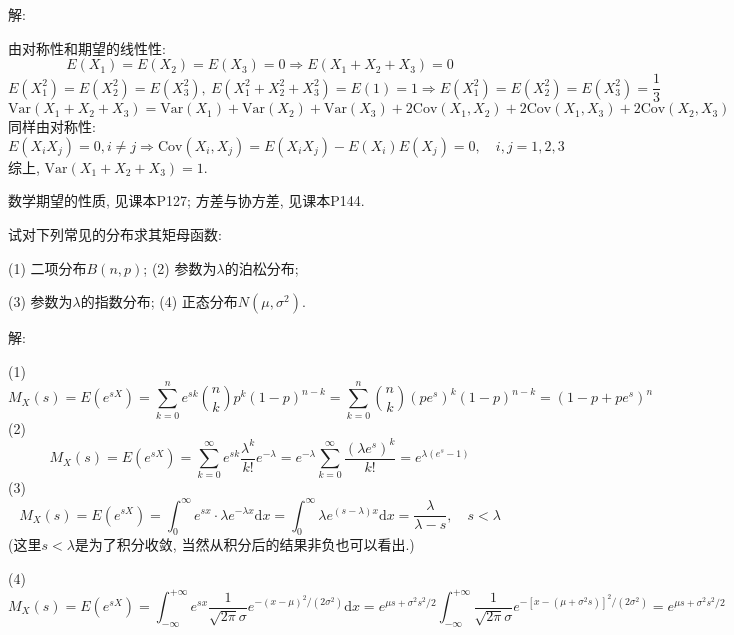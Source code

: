 \documentclass[standard]{ExBook}
\renewenvironment{shaded}{%
  \def\FrameCommand{\fboxsep=\FrameSep \colorbox{shadecolor}}%
  \MakeFramed{\advance\hsize-\width \FrameRestore}%
}{%
  \endMakeFramed
}
\begin{document}
\begin{qitems}
\vspace{\dimexpr2.5cm-5em\relax}

解: 

由对称性和期望的线性性:
$$E(X_1)=E(X_2)=E(X_3)=0 \Longrightarrow E(X_1+X_2+X_3)=0$$
$$E(X_1^2)=E(X_2^2)=E(X_3^2),\ E(X_1^2+X_2^2+X_3^2)=E(1)=1 \Longrightarrow E(X_1^2)=E(X_2^2)=E(X_3^2)=\frac{1}{3}$$
$$\mathrm{Var}(X_1+X_2+X_3)=\mathrm{Var}(X_1)+\mathrm{Var}(X_2)+\mathrm{Var}(X_3)+2\mathrm{Cov}(X_1,X_2)+2\mathrm{Cov}(X_1,X_3)+2\mathrm{Cov}(X_2,X_3)$$
同样由对称性:
$$E(X_i X_j)=0, i\neq j \Longrightarrow \mathrm{Cov}(X_i,X_j)=E(X_i X_j)-E(X_i)E(X_j)=0,\quad i,j=1,2,3$$
综上, $\mathrm{Var}(X_1+X_2+X_3)=1$.

\textcolor{themeColor}{\selectfont {} 数学期望的性质, 见课本P127; 方差与协方差, 见课本P144.}

\vspace{2.5cm-5em}

    \begin{bbox}
    \begin{shaded}
        \qitem
试对下列常见的分布求其矩母函数:

(1) 二项分布$B(n,p)$; (2) 参数为$\lambda$的泊松分布;

(3) 参数为$\lambda$的指数分布; (4) 正态分布$N(\mu,\sigma^2)$.
    \end{shaded}
    \end{bbox}

\vspace{\dimexpr2.5cm-5em\relax}

解: 

(1)
$$\displaystyle M_{X}(s)=E(e^{sX})=\sum\limits_{k=0}^{n}e^{sk}\binom{n}{k}p^{k}(1-p)^{n-k}=\sum\limits_{k=0}^{n}\binom{n}{k}\left(p e^{s}\right)^{k}(1-p)^{n-k}=\left(1-p+p e^{s}\right)^{n}$$
(2)
$$\displaystyle M_{X}(s)=E(e^{sX})=\sum\limits_{k=0}^{\infty}e^{sk}\frac{\lambda^k}{k!}e^{-\lambda}=e^{-\lambda}\sum\limits_{k=0}^{\infty}\frac{\left(\lambda e^{s}\right)^{k}}{k!}=e^{\lambda\left(e^s-1\right)}$$
(3)
$$\displaystyle M_{X}(s)=E(e^{sX})=\int_{0}^{\infty}e^{sx}\cdot \lambda e^{-\lambda x}\mathrm{d}x=\int_{0}^{\infty}\lambda e^{(s-\lambda)x}\mathrm{d}x=\frac{\lambda}{\lambda-s},\quad s<\lambda$$
(这里$s<\lambda$是为了积分收敛, 当然从积分后的结果非负也可以看出.)

(4)
$$\displaystyle M_{X}(s)=E(e^{sX})=\int_{-\infty}^{+\infty}e^{sx}\frac{1}{\sqrt{2\pi}\sigma}e^{-(x-\mu)^2/\left(2\sigma^2\right)}\mathrm{d}x=e^{\mu s+\sigma^2 s^2/2}\int_{-\infty}^{+\infty}\frac{1}{\sqrt{2\pi}\sigma}e^{-\left[x-\left(\mu+\sigma^2 s\right)\right]^2/\left(2\sigma^2\right)}=e^{\mu s+\sigma^2 s^2/2}$$


\end{qitems}
\end{document}

